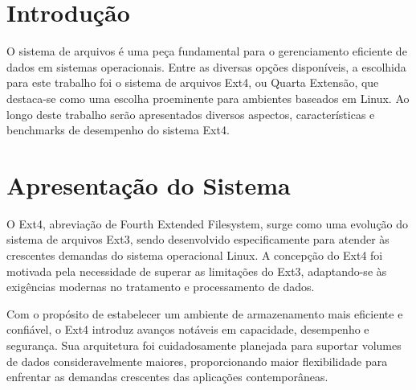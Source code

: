 \documentclass[
	12pt,				%
	openright,			%
	oneside,			%
	a4paper,			%
	chapter=TITLE,		%
	english,			%
	french,				%
	spanish,			%
	brazil				%
	]{abntex2}
\theoremstyle{definition}
\begin{document}
\frenchspacing 

\imprimircapa


\imprimirfolhaderosto

\newpage

\setlength{\absparsep}{18pt} %

\tableofcontents*
\cleardoublepage
\textual


\chapter{Introdução}
O sistema de arquivos é uma peça fundamental para o gerenciamento eficiente de dados em 
sistemas operacionais. Entre as diversas opções disponíveis, a escolhida para este trabalho 
foi o sistema de arquivos Ext4, ou Quarta Extensão, que destaca-se como uma escolha proeminente para ambientes 
baseados em Linux. Ao longo deste trabalho serão apresentados diversos aspectos, características e benchmarks de desempenho 
do sistema Ext4.

\chapter{Apresentação do Sistema}
O Ext4, abreviação de Fourth Extended Filesystem, surge como uma evolução do sistema de arquivos Ext3, sendo desenvolvido especificamente para atender às crescentes demandas do sistema operacional Linux. A concepção do Ext4 foi motivada pela necessidade de superar as limitações do Ext3, adaptando-se às exigências modernas no tratamento e processamento de dados.

Com o propósito de estabelecer um ambiente de armazenamento mais eficiente e confiável, o Ext4 introduz avanços notáveis em capacidade, desempenho e segurança. Sua arquitetura foi cuidadosamente planejada para suportar volumes de dados consideravelmente maiores, proporcionando maior flexibilidade para enfrentar as demandas crescentes das aplicações contemporâneas.
\end{document}
